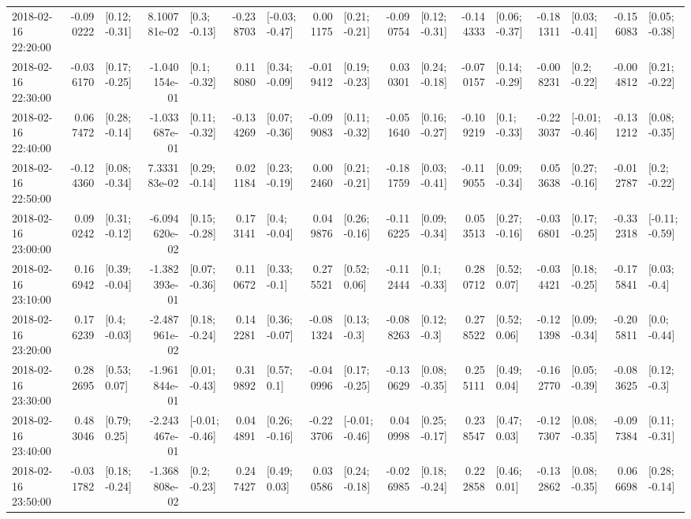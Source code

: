 \begin{tabular}{lrlrlrlrlrlrlrlrl}
2018-02-16 22:20:00 & -0.090222 &   [0.12; -0.31] &  8.100781e-02 &    [0.3; -0.13] & -0.238703 &  [-0.03; -0.47] &  0.001175 &   [0.21; -0.21] & -0.090754 &   [0.12; -0.31] & -0.144333 &   [0.06; -0.37] & -0.181311 &   [0.03; -0.41] & -0.156083 &   [0.05; -0.38] \\
2018-02-16 22:30:00 & -0.036170 &   [0.17; -0.25] & -1.040154e-01 &    [0.1; -0.32] &  0.118080 &   [0.34; -0.09] & -0.019412 &   [0.19; -0.23] &  0.030301 &   [0.24; -0.18] & -0.070157 &   [0.14; -0.29] & -0.008231 &    [0.2; -0.22] & -0.004812 &   [0.21; -0.22] \\
2018-02-16 22:40:00 &  0.067472 &   [0.28; -0.14] & -1.033687e-01 &   [0.11; -0.32] & -0.134269 &   [0.07; -0.36] & -0.099083 &   [0.11; -0.32] & -0.051640 &   [0.16; -0.27] & -0.109219 &    [0.1; -0.33] & -0.223037 &  [-0.01; -0.46] & -0.131212 &   [0.08; -0.35] \\
2018-02-16 22:50:00 & -0.124360 &   [0.08; -0.34] &  7.333183e-02 &   [0.29; -0.14] &  0.021184 &   [0.23; -0.19] &  0.002460 &   [0.21; -0.21] & -0.181759 &   [0.03; -0.41] & -0.119055 &   [0.09; -0.34] &  0.053638 &   [0.27; -0.16] & -0.012787 &    [0.2; -0.22] \\
2018-02-16 23:00:00 &  0.090242 &   [0.31; -0.12] & -6.094620e-02 &   [0.15; -0.28] &  0.173141 &    [0.4; -0.04] &  0.049876 &   [0.26; -0.16] & -0.116225 &   [0.09; -0.34] &  0.053513 &   [0.27; -0.16] & -0.036801 &   [0.17; -0.25] & -0.332318 &  [-0.11; -0.59] \\
2018-02-16 23:10:00 &  0.166942 &   [0.39; -0.04] & -1.382393e-01 &   [0.07; -0.36] &  0.110672 &    [0.33; -0.1] &  0.275521 &    [0.52; 0.06] & -0.112444 &    [0.1; -0.33] &  0.280712 &    [0.52; 0.07] & -0.034421 &   [0.18; -0.25] & -0.175841 &    [0.03; -0.4] \\
2018-02-16 23:20:00 &  0.176239 &    [0.4; -0.03] & -2.487961e-02 &   [0.18; -0.24] &  0.142281 &   [0.36; -0.07] & -0.081324 &    [0.13; -0.3] & -0.088263 &    [0.12; -0.3] &  0.278522 &    [0.52; 0.06] & -0.121398 &   [0.09; -0.34] & -0.205811 &    [0.0; -0.44] \\
2018-02-16 23:30:00 &  0.282695 &    [0.53; 0.07] & -1.961844e-01 &   [0.01; -0.43] &  0.319892 &     [0.57; 0.1] & -0.040996 &   [0.17; -0.25] & -0.130629 &   [0.08; -0.35] &  0.255111 &    [0.49; 0.04] & -0.162770 &   [0.05; -0.39] & -0.083625 &    [0.12; -0.3] \\
2018-02-16 23:40:00 &  0.483046 &    [0.79; 0.25] & -2.243467e-01 &  [-0.01; -0.46] &  0.044891 &   [0.26; -0.16] & -0.223706 &  [-0.01; -0.46] &  0.040998 &   [0.25; -0.17] &  0.238547 &    [0.47; 0.03] & -0.127307 &   [0.08; -0.35] & -0.097384 &   [0.11; -0.31] \\
2018-02-16 23:50:00 & -0.031782 &   [0.18; -0.24] & -1.368808e-02 &    [0.2; -0.23] &  0.247427 &    [0.49; 0.03] &  0.030586 &   [0.24; -0.18] & -0.026985 &   [0.18; -0.24] &  0.222858 &    [0.46; 0.01] & -0.132862 &   [0.08; -0.35] &  0.066698 &   [0.28; -0.14] \\
\bottomrule
\end{tabular}
